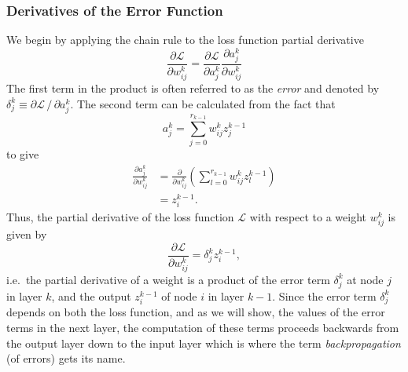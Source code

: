 \documentclass[../main.tex]{subfiles}
\begin{document}
\subsubsection{Derivatives of the Error Function}
We begin by applying the chain rule to the loss function partial derivative
%
\begin{equation}
  \frac{\partial \mathcal{L}}{\partial w_{ij}^{k}} = \frac{\partial
    \mathcal{L}}{\partial a_{j}^{k}} \frac{\partial a_{j}^{k}}{\partial
    w_{ij}^{k}}
\end{equation}
%
The first term in the product is often referred to as the \emph{error} and
denoted by $\delta_{j}^{k} \equiv \partial \mathcal{L}\,/\,\partial a_{j}^{k}$.
%
The second term can be calculated from the fact that
%
\begin{equation}
  a_{j}^{k} = \sum_{j=0}^{r_{k-1}} w_{ij}^{k} z_{j}^{k-1}
\end{equation}
%
to give
%
\begin{align}
  \frac{\partial a_{j}^{k}}{\partial w_{ij}^{k}}
  &= \frac{\partial}{\partial w_{ij}^{k}}{\left(\sum_{l=0}^{r_{k-1}} w_{ij}^{k}
    z_{l}^{k-1}\right)}\\ 
  &= z_{i}^{k-1}.
\end{align}
%
Thus, the partial derivative of the loss function $\mathcal{L}$ with respect to
a weight $w_{ij}^{k}$ is given by
%
\begin{equation}
  \frac{\partial \mathcal{L}}{\partial w_{ij}^{k}} = \delta_{j}^{k} z_{i}^{k-1},
\end{equation}
%
i.e.\ the partial derivative of a weight is a product of the error term
$\delta_{j}^{k}$ at node $j$ in layer $k$, and the output $z_{i}^{k-1}$ of node
$i$ in layer $k-1$.
%
Since the error term $\delta_{j}^{k}$ depends on both the loss function, and as
we will show, the values of the error terms in the next layer, the computation
of these terms proceeds backwards from the output layer down to the input layer
which is where the term \emph{backpropagation} (of errors) gets its name.
%
\end{document}
